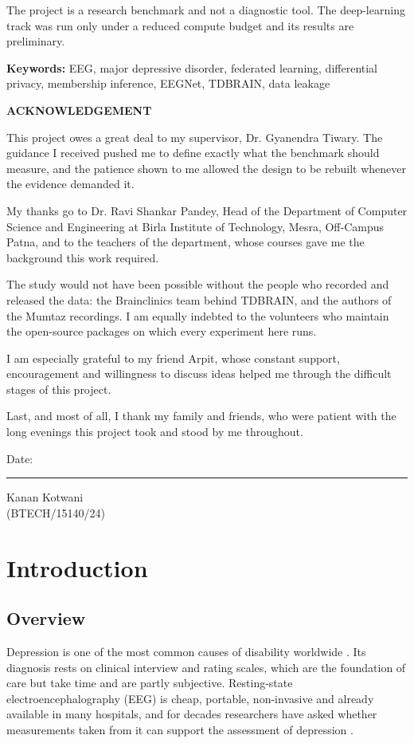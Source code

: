 \documentclass[12pt,a4paper,oneside]{report}
\newcommand{\frontheading}[1]{\begin{center}{\Large\bfseries #1}\end{center}\vspace{6pt}\addcontentsline{toc}{chapter}{#1}}
\newcommand{\sigline}[1]{\rule{#1}{0.4pt}}
\begin{document}
The project is a research benchmark and not a diagnostic tool. The deep-learning track was run only under a reduced compute budget and its results are preliminary.

\textbf{Keywords:} EEG, major depressive disorder, federated learning, differential privacy, membership inference, EEGNet, TDBRAIN, data leakage
\newpage
\frontheading{ACKNOWLEDGEMENT}
This project owes a great deal to my supervisor, Dr. Gyanendra Tiwary. The guidance I received pushed me to define exactly what the benchmark should measure, and the patience shown to me allowed the design to be rebuilt whenever the evidence demanded it.

My thanks go to Dr. Ravi Shankar Pandey, Head of the Department of Computer Science and Engineering at Birla Institute of Technology, Mesra, Off-Campus Patna, and to the teachers of the department, whose courses gave me the background this work required.

The study would not have been possible without the people who recorded and released the data: the Brainclinics team behind TDBRAIN, and the authors of the Mumtaz recordings. I am equally indebted to the volunteers who maintain the open-source packages on which every experiment here runs.

I am especially grateful to my friend Arpit, whose constant support, encouragement and willingness to discuss ideas helped me through the difficult stages of this project.

Last, and most of all, I thank my family and friends, who were patient with the long evenings this project took and stood by me throughout.
\vspace{1.5cm}

Date: \sigline{3cm}\hfill Kanan Kotwani\\
\mbox{}\hfill (BTECH/15140/24)
\newpage
\tableofcontents
\newpage
{}
\listoffigures
\newpage
{}
\listoftables
\newpage
{}
\pagestyle{mainpages}

\chapter{Introduction}

\section{Overview}
Depression is one of the most common causes of disability worldwide \cite{who}. Its diagnosis rests on clinical interview and rating scales, which are the foundation of care but take time and are partly subjective. Resting-state electroencephalography (EEG) is cheap, portable, non-invasive and already available in many hospitals, and for decades researchers have asked whether measurements taken from it can support the assessment of depression \cite{review}.
\end{document}

